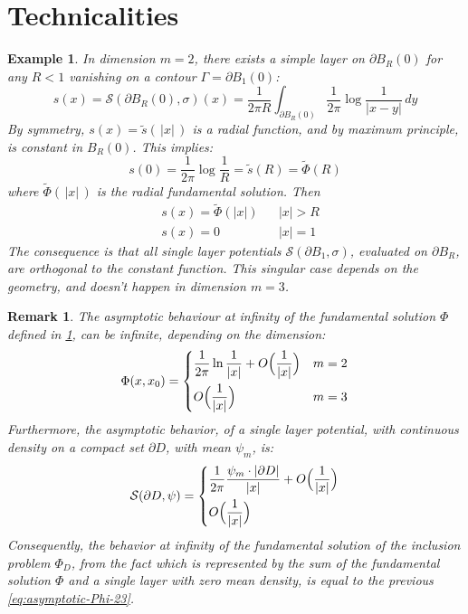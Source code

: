 \documentclass[10pt, a4paper, twoside, openright]{book}
\theoremstyle{definition}
\theoremstyle{plain}
\theoremstyle{plain}
\theoremstyle{plain}
\theoremstyle{plain}
\newtheorem{remark}[subsection]{Remark}
\theoremstyle{plain}
\theoremstyle{plain}
\newtheorem{example}[subsection]{Example}
\theoremstyle{plain}
\theoremstyle{plain}
\begin{document}
\section{Technicalities}
\begin{example}
 \label{example:van-s-lay}
 In dimension $m=2$, there exists a simple layer on $\partial B_R(0)$ for any $R<1$ vanishing on a contour $\Gamma = \partial B_1(0)$:
 \begin{equation}
 s(x) = \mathcal{S}(\partial B_R(0), \sigma)(x) = \frac{1}{2\pi R}\int_{\partial B_R(0)}\frac{1}{2\pi}\log\frac{1}{|x-y|}\,dy
 \end{equation}
 By symmetry, $s(x)=\tilde{s}(\,|x|\,)$ is a radial function, and by maximum principle, is constant in $B_R(0)$. This implies:
 \begin{equation}
  s(0) = \frac{1}{2\pi}\log\frac{1}{R}=\tilde{s}(R)=\tilde{\Phi}(R)
 \end{equation}
 where $\tilde{\Phi}(\,|x|\,)$ is the radial fundamental solution. Then
 \begin{align}
 & s(x) = \tilde{\Phi}(|x|) && |x| > R \\
 & s(x) = 0         && |x| = 1
 \end{align}
 The consequence is that all single layer potentials $\mathcal{S}(\partial B_1, \sigma)$, evaluated on $\partial B_R$, are orthogonal to the constant function. This singular case depends on the geometry, and doesn't happen in dimension $m=3$.
\end{example}
\begin{remark}
 The asymptotic behaviour at infinity of the fundamental solution $\Phi$ defined in \ref{}, can be infinite, depending on the dimension:
 \begin{equation}
 \label{eq:asymptotic-Phi-23}
  \Phi(x,x_0)=
  \left\{
  \begin{aligned}
   &\dfrac{1}{2\pi}\ln\dfrac{1}{|x|} + O\Bigl(\dfrac{1}{|x|}\Bigr) && m=2 \\
   &O\Bigl(\dfrac{1}{|x|}\Bigr) && m=3
  \end{aligned}
  \right.
\end{equation}
 Furthermore, the asymptotic behavior, of a single layer potential, with continuous density on a compact set $\partial D$, with mean $\psi_m$, is:
  \begin{equation}
 \label{eq:asymptotic-single}
  \mathcal{S}(\partial D,\psi)=
  \left\{
  \begin{aligned}
   &\dfrac{1}{2\pi}\dfrac{\psi_m\cdot|\partial D|}{|x|} + O\Bigl(\dfrac{1}{|x|}\Bigr) \\%
   &O\Bigl(\dfrac{1}{|x|}\Bigr) %
  \end{aligned}
  \right.
\end{equation}
Consequently, the behavior at infinity of the fundamental solution of the inclusion problem $\Phi_D$, from the fact which is represented by the sum of the fundamental solution $\Phi$ and a single layer with zero mean density, is equal to the previous \ref{eq:asymptotic-Phi-23}. 
\end{remark}
\end{document}
